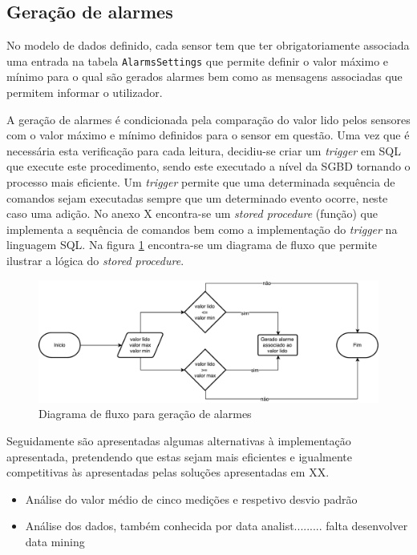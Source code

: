 \subsection{Geração de alarmes}

No modelo de dados definido, cada sensor tem que ter obrigatoriamente associada uma entrada na tabela \texttt{AlarmsSettings} que permite definir o valor máximo e mínimo para o qual são gerados alarmes bem como as mensagens associadas que permitem informar o utilizador. 

A geração de alarmes é condicionada pela comparação do valor lido pelos sensores com o valor máximo e mínimo definidos para o sensor em questão. Uma vez que é necessária esta verificação para cada leitura, decidiu-se criar um \textit{trigger} em \ac{SQL} que execute este procedimento, sendo este executado a nível da \ac{SGBD} tornando o processo mais eficiente. Um \textit{trigger} permite que uma determinada sequência de comandos sejam executadas sempre que um determinado evento ocorre, neste caso uma adição. No anexo X encontra-se um \textit{stored procedure} (função) que implementa a sequência de comandos bem como a implementação do \textit{trigger} na linguagem \ac{SQL}. Na figura \ref{fluxoSP} encontra-se um diagrama de fluxo que permite ilustrar a lógica do \textit{stored procedure}. 



\begin{figure}[!htb]
	\centering
	\includegraphics[scale=0.5]{esquemas/diagramafluxoalarms.pdf}
	\caption{Diagrama de fluxo para geração de alarmes}
	\label{fluxoSP}
\end{figure}



Seguidamente são apresentadas algumas alternativas à implementação apresentada, pretendendo que estas sejam mais eficientes e igualmente competitivas às apresentadas pelas soluções apresentadas em XX. 

\begin{itemize}
	\item Análise do valor médio de cinco medições e respetivo desvio padrão 
	\item Análise dos dados, também conhecida por data analist......... falta desenvolver data mining  
\end{itemize}


